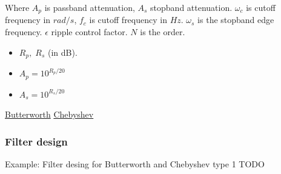 Where $A_p$ is passband attenuation, $A_s$ stopband attenuation. 
$\omega_c$ is cutoff frequency in $rad/s$, $f_c$ is cutoff frequency in $Hz$.
$\omega_s$ is the stopband edge frequency. $\epsilon$ ripple control factor.
$N$ is the order.
\begin{itemize}
	\item $R_p, \; R_s$ (in dB). 
	\item $A_p=10^{R_p/20}$
	\item $A_s=10^{R_s/20}$
\end{itemize}

\href{https://en.wikipedia.org/wiki/Butterworth_filter}{Butterworth}
\href{https://www.semanticscholar.org/paper/Low-pass-filter-approximation-with-evolutionary-Ayten-Vural/447a00e54c1abb6e98ddf243a3de1cba33cd5200/figure/0}{Chebyshev}









\subsubsection{Filter design}
\begin{exampleblock}{Example: Filter desing for Butterworth and Chebyshev type 1}
	TODO
\end{exampleblock}

